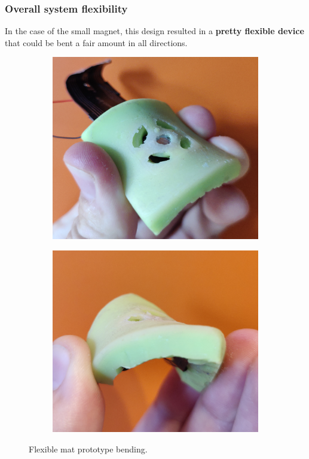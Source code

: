 \subsubsection{Overall system flexibility}
In the case of the small magnet, this design resulted in a \textbf{pretty flexible device} that could be bent a fair amount in all directions.
\begin{figure}[H]
    \centering
    \begin{subfigure}[b]{0.475\textwidth}
        \centering
        \includegraphics[width = 1\linewidth]{Chapters/Chapter5/Flexible_Mat_Prototypes/Figures/flexing_mat_top.png}
    \end{subfigure}
    \hfill
    \begin{subfigure}[b]{0.475\textwidth}  
        \centering 
        \includegraphics[width = 1\linewidth]{Chapters/Chapter5/Flexible_Mat_Prototypes/Figures/flexing_mat_btm.png}
    \end{subfigure}
    \caption{Flexible mat prototype bending.}
    \label{fig: Flexible_mat_bending}
\end{figure}

